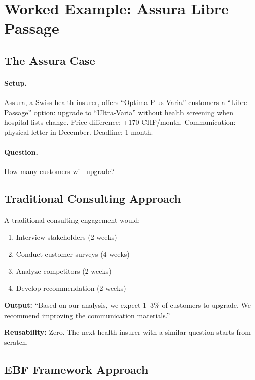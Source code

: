 \section{Worked Example: Assura Libre Passage}
\label{sec:fm-example}

\subsection{The Assura Case}

\paragraph{Setup.} Assura, a Swiss health insurer, offers ``Optima Plus Varia'' customers a ``Libre Passage'' option: upgrade to ``Ultra-Varia'' without health screening when hospital lists change. Price difference: +170 CHF/month. Communication: physical letter in December. Deadline: 1 month.

\paragraph{Question.} How many customers will upgrade?

\subsection{Traditional Consulting Approach}

A traditional consulting engagement would:
\begin{enumerate}
    \item Interview stakeholders (2 weeks)
    \item Conduct customer surveys (4 weeks)
    \item Analyze competitors (2 weeks)
    \item Develop recommendation (2 weeks)
\end{enumerate}

\textbf{Output:} ``Based on our analysis, we expect 1--3\% of customers to upgrade. We recommend improving the communication materials.''

\textbf{Reusability:} Zero. The next health insurer with a similar question starts from scratch.

\subsection{EBF Framework Approach}

